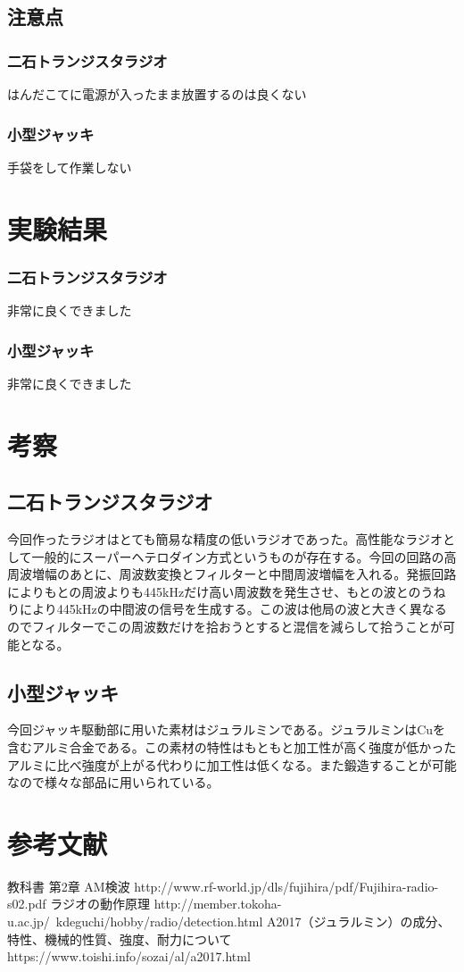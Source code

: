 \documentclass{jsarticle}
\begin{document}
\subsection{注意点}
\subsubsection{二石トランジスタラジオ}
はんだこてに電源が入ったまま放置するのは良くない
\subsubsection{小型ジャッキ}
手袋をして作業しない\\
\section{実験結果}
\subsubsection{二石トランジスタラジオ}
非常に良くできました
\subsubsection{小型ジャッキ}
非常に良くできました
\section{考察}
\subsection{二石トランジスタラジオ}
今回作ったラジオはとても簡易な精度の低いラジオであった。高性能なラジオとして一般的にスーパーヘテロダイン方式というものが存在する。今回の回路の高周波増幅のあとに、周波数変換とフィルターと中間周波増幅を入れる。発振回路によりもとの周波よりも445kHzだけ高い周波数を発生させ、もとの波とのうねりにより445kHzの中間波の信号を生成する。この波は他局の波と大きく異なるのでフィルターでこの周波数だけを拾おうとすると混信を減らして拾うことが可能となる。
\subsection{小型ジャッキ}
今回ジャッキ駆動部に用いた素材はジュラルミンである。ジュラルミンはCuを含むアルミ合金である。この素材の特性はもともと加工性が高く強度が低かったアルミに比べ強度が上がる代わりに加工性は低くなる。また鍛造することが可能なので様々な部品に用いられている。

\section{参考文献}
\begin{thebibliography}{99}
\bibitem{} 教科書
\bibitem{} 第2章 AM検波 http://www.rf-world.jp/dls/fujihira/pdf/Fujihira-radio-s02.pdf
\bibitem{} ラジオの動作原理 http://member.tokoha-u.ac.jp/~kdeguchi/hobby/radio/detection.html
\bibitem{} A2017（ジュラルミン）の成分、特性、機械的性質、強度、耐力について https://www.toishi.info/sozai/al/a2017.html
\end{thebibliography} 
\end{document}
